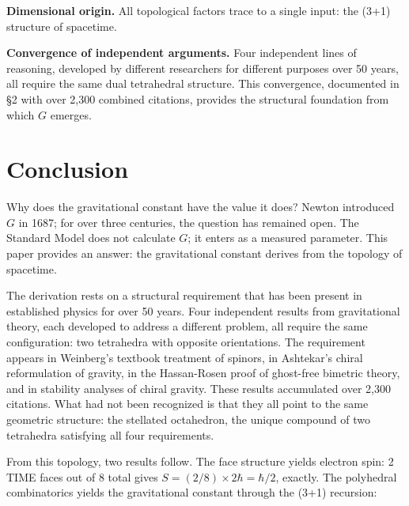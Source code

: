 \documentclass[aps,prd,preprint,superscriptaddress,showpacs,preprintnumbers,amsmath,amssymb,nofootinbib]{revtex4-2}
\begin{document}
\textbf{Dimensional origin.} All topological factors trace to a single input: the (3+1) structure of spacetime.

\textbf{Convergence of independent arguments.} Four independent lines of reasoning, developed by different researchers for different purposes over 50 years, all require the same dual tetrahedral structure. This convergence, documented in \S2 with over 2,300 combined citations, provides the structural foundation from which $G$ emerges.

\section{Conclusion}
\label{sec:conclusion}

Why does the gravitational constant have the value it does? Newton introduced $G$ in 1687; for over three centuries, the question has remained open. The Standard Model does not calculate $G$; it enters as a measured parameter. This paper provides an answer: the gravitational constant derives from the topology of spacetime.

The derivation rests on a structural requirement that has been present in established physics for over 50 years. Four independent results from gravitational theory, each developed to address a different problem, all require the same configuration: two tetrahedra with opposite orientations. The requirement appears in Weinberg's textbook treatment of spinors, in Ashtekar's chiral reformulation of gravity, in the Hassan-Rosen proof of ghost-free bimetric theory, and in stability analyses of chiral gravity. These results accumulated over 2,300 citations. What had not been recognized is that they all point to the same geometric structure: the stellated octahedron, the unique compound of two tetrahedra satisfying all four requirements.

From this topology, two results follow. The face structure yields electron spin: 2 TIME faces out of 8 total gives $S = (2/8) \times 2\hbar = \hbar/2$, exactly. The polyhedral combinatorics yields the gravitational constant through the (3+1) recursion:
\end{document}

